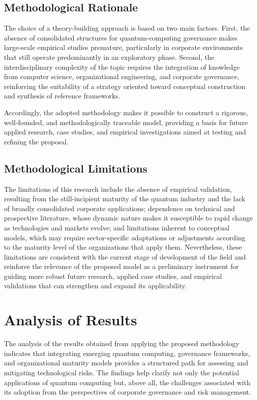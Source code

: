 \documentclass{icis}
\begin{document}
\subsection{Methodological Rationale}
The choice of a theory-building approach is based on two main factors. First, the absence of consolidated structures for quantum-computing governance makes large-scale empirical studies premature, particularly in corporate environments that still operate predominantly in an exploratory phase. Second, the interdisciplinary complexity of the topic requires the integration of knowledge from computer science, organizational engineering, and corporate governance, reinforcing the suitability of a strategy oriented toward conceptual construction and synthesis of reference frameworks.

Accordingly, the adopted methodology makes it possible to construct a rigorous, well-founded, and methodologically traceable model, providing a basis for future applied research, case studies, and empirical investigations aimed at testing and refining the proposal.

\subsection{Methodological Limitations}
The limitations of this research include the absence of empirical validation, resulting from the still-incipient maturity of the quantum industry and the lack of broadly consolidated corporate applications; dependence on technical and prospective literature, whose dynamic nature makes it susceptible to rapid change as technologies and markets evolve; and limitations inherent to conceptual models, which may require sector-specific adaptations or adjustments according to the maturity level of the organizations that apply them. Nevertheless, these limitations are consistent with the current stage of development of the field and reinforce the relevance of the proposed model as a preliminary instrument for guiding more robust future research, applied case studies, and empirical validations that can strengthen and expand its applicability.

\section{Analysis of Results}
The analysis of the results obtained from applying the proposed methodology indicates that integrating emerging quantum computing, governance frameworks, and organizational maturity models provides a structured path for assessing and mitigating technological risks. The findings help clarify not only the potential applications of quantum computing but, above all, the challenges associated with its adoption from the perspectives of corporate governance and risk management.
\end{document}
